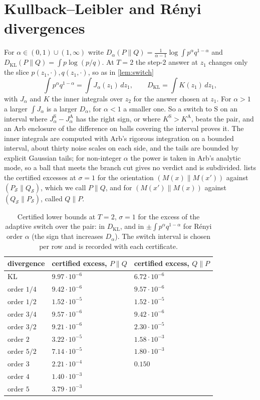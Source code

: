 \documentclass[11pt]{amsart}
\theoremstyle{definition}
\theoremstyle{remark}
\newcommand{\ANTI}{\mathrm{A}}
\newcommand{\SAME}{\mathrm{S}}
\begin{document}
\section{Kullback--Leibler and R\'enyi divergences}\label{sec:renyi}

For $\alpha\in(0,1)\cup(1,\infty)$ write $D_\alpha(P\|Q)=\frac1{\alpha-1}\log\int p^\alpha q^{1-\alpha}$ and $D_{\mathrm{KL}}(P\|Q)=\int p\log(p/q)$. At $T=2$ the step-$2$ answer at $z_1$ changes only the slice $p(z_1,\cdot),q(z_1,\cdot)$, so as in \cref{lem:switch}
\[
\int p^\alpha q^{1-\alpha}=\int J_\alpha(z_1)\,dz_1,\qquad D_{\mathrm{KL}}=\int K(z_1)\,dz_1,
\]
with $J_\alpha$ and $K$ the inner integrals over $z_2$ for the answer chosen at $z_1$. For $\alpha>1$ a larger $\int J_\alpha$ is a larger $D_\alpha$, for $\alpha<1$ a smaller one. So a switch to $\SAME$ on an interval where $J_\alpha^{\SAME}-J_\alpha^{\ANTI}$ has the right sign, or where $K^{\SAME}>K^{\ANTI}$, beats the pair, and an Arb enclosure of the difference on balls covering the interval proves it. The inner integrals are computed with Arb's rigorous integration on a bounded interval, about thirty noise scales on each side, and the tails are bounded by explicit Gaussian tails; for non-integer $\alpha$ the power is taken in Arb's analytic mode, so a ball that meets the branch cut gives no verdict and is subdivided.  lists the certified excesses at $\sigma=1$ for the orientation $(M(x)\|M(x'))$ against $(P_{\mathcal S}\|Q_{\mathcal S})$, which we call $P\|Q$, and for $(M(x')\|M(x))$ against $(Q_{\mathcal S}\|P_{\mathcal S})$, called $Q\|P$.

\begin{table}[ht]
\centering
\begin{tabular}{lll}
\toprule
divergence & certified excess, $P\|Q$ & certified excess, $Q\|P$\\
\midrule
KL & $9.97\cdot10^{-6}$ & $6.72\cdot10^{-6}$\\
order $1/4$ & $9.42\cdot10^{-6}$ & $9.57\cdot10^{-6}$\\
order $1/2$ & $1.52\cdot10^{-5}$ & $1.52\cdot10^{-5}$\\
order $3/4$ & $9.57\cdot10^{-6}$ & $9.42\cdot10^{-6}$\\
order $3/2$ & $9.21\cdot10^{-6}$ & $2.30\cdot10^{-5}$\\
order $2$ & $3.22\cdot10^{-5}$ & $1.58\cdot10^{-3}$\\
order $5/2$ & $7.14\cdot10^{-5}$ & $1.80\cdot10^{-3}$\\
order $3$ & $2.21\cdot10^{-4}$ & $0.150$\\
order $4$ & $1.40\cdot10^{-3}$ & \\
order $5$ & $3.79\cdot10^{-3}$ & \\
\bottomrule
\end{tabular}
\medskip
\caption{Certified lower bounds at $T=2$, $\sigma=1$ for the excess of the adaptive switch over the pair: in $D_{\mathrm{KL}}$, and in $\pm\int p^\alpha q^{1-\alpha}$ for R\'enyi order $\alpha$ (the sign that increases $D_\alpha$). The switch interval is chosen per row and is recorded with each certificate.}
\label{tab:renyi}
\end{table}
\end{document}
